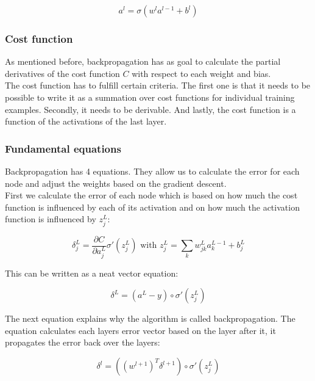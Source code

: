 \begin{equation} 
a^l = \sigma (w^la^{l-1}+b^l)
\end{equation}

		\subsubsection{Cost function}
		
As mentioned before, backpropagation has as goal to calculate the partial derivatives of the cost function $C$ with respect to each weight and bias. \\
The cost function has to fulfill certain criteria. The first one is that it needs to be possible to write it as a summation over cost functions for individual training examples. Secondly, it needs to be derivable. And lastly, the cost function is a function of the activations of the last layer. 


		\subsubsection{Fundamental equations}

Backpropagation has 4 equations. They allow us to calculate the error for each node and adjust the weights based on the gradient descent. \\

First we calculate the error of each node which is based on how much the cost function is influenced by each of its activation and on how much the activation function is influenced by $z_j^L$:

\begin{equation} 
\delta^L_j = \frac{\partial C}{\partial a^L_j} \sigma'(z_j^L)
\text{ with }
z_j^L = \sum_k w^L_{jk}a^{L-1}_k+b^L_j
\end{equation}

\noindent This can be written as a neat vector equation:

\begin{equation} 
\delta^L = (a^L-y) \circ \sigma'(z_j^L)
\end{equation}

\noindent The next equation explains why the algorithm is called backpropagation. The equation calculates each layers error vector based on the layer after it, it propagates the error back over the layers:

\begin{equation} 
\delta^l = ((w^{l+1})^T\delta^{l+1}) \circ \sigma'(z_j^L)
\end{equation}

